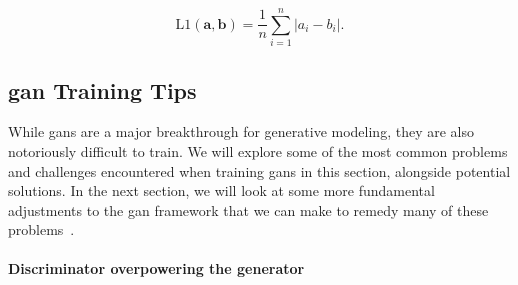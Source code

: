\[
	\mathrm{L1}(\mathbf{a},\mathbf{b}) = \frac{1}{n} \sum_{i=1}^n |a_i - b_i|
	.\]

\subsection{\gls{gan} Training Tips}

While \glspl{gan}  are a major breakthrough for generative modeling, they are also notoriously difficult to train.
We will explore some of the most common problems and challenges encountered when training \glspl{gan}  in this section, alongside potential solutions.
In the next section, we will look at some more fundamental adjustments to the \gls{gan} framework that we can make to remedy many of these problems~\cite{foster2022generative}.


\paragraph{Discriminator overpowering the generator}




